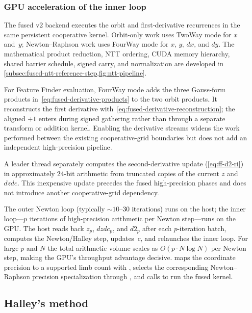 \subsubsection{GPU acceleration of the inner loop}
\label{subsec:ff-inner-gpu}

The fused v2 backend executes the orbit and first-derivative recurrences in the
same persistent cooperative kernel.  Orbit-only work uses TwoWay mode for
$x$ and~$y$; Newton--Raphson work uses FourWay mode for $x$, $y$, $dx$, and
$dy$.  The mathematical product reduction, NTT ordering, CUDA memory hierarchy,
shared barrier schedule, signed carry, and normalization are developed in
\cref{subsec:fused-ntt-reference-step,fig:ntt-pipeline}.

For Feature Finder evaluation, FourWay mode adds the three Gauss-form products
in~\eqref{eq:fused-derivative-products} to the two orbit products.  It reconstructs
the first derivative with~\eqref{eq:fused-derivative-reconstruction}; the aligned
$+1$ enters during signed gathering rather than through a separate transform or
addition kernel.  Enabling the derivative streams widens the work performed
between the existing cooperative-grid boundaries but does not add an independent
high-precision pipeline.

A leader thread separately computes the second-derivative update
(\cref{eq:ff-d2-ri}) in approximately 24-bit  arithmetic from
truncated copies of the current $z$ and $\mathit{dzdc}$.  This inexpensive
update precedes the fused high-precision phases and does not introduce another
cooperative-grid dependency.

\medskip
\noindent
The outer Newton loop (typically ${\sim}10$--$30$ iterations) runs on
the host; the inner loop---$p$ iterations of high-precision
arithmetic per Newton step---runs on the GPU.  The host reads back
$z_p$, $\mathit{dzdc}_p$, and $d2_p$ after each $p$-iteration batch,
computes the Newton/Halley step, updates~$c$, and relaunches the inner
loop.  For large $p$ and $N$ the total arithmetic volume scales as
$O(p \cdot N \log N)$ per Newton step, making the GPU's throughput
advantage decisive.   maps the coordinate
precision to a supported limb count with ,
selects the corresponding Newton--Raphson precision specialization through
, and calls
 to run the fused kernel.

\subsection{Halley's method}
\label{subsec:ff-halley}

